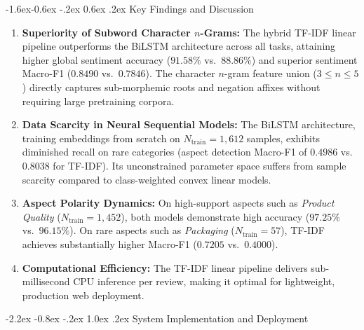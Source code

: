 \documentclass[12pt,a4paper]{article}
\makeatletter
\renewcommand{\section}{\@startsection{section}{1}{\z@}%
  {-2.2ex \@plus -0.8ex \@minus -.2ex}%
  {1.0ex \@plus.2ex}%
  {\normalfont\LARGE\bfseries}}
\renewcommand{\subsection}{\@startsection{subsection}{2}{\z@}%
  {-1.6ex\@plus -0.6ex \@minus -.2ex}%
  {0.6ex \@plus .2ex}%
  {\normalfont\Large\bfseries}}
\makeatother
\begin{document}
\subsection{Key Findings and Discussion}
\begin{enumerate}
    \item \textbf{Superiority of Subword Character $n$-Grams:} The hybrid TF-IDF linear pipeline outperforms the BiLSTM architecture across all tasks, attaining higher global sentiment accuracy ($91.58\%$ vs.\ $88.86\%$) and superior sentiment Macro-F1 ($0.8490$ vs.\ $0.7846$). The character $n$-gram feature union ($3 \le n \le 5$) directly captures sub-morphemic roots and negation affixes without requiring large pretraining corpora.
    
    \item \textbf{Data Scarcity in Neural Sequential Models:} The BiLSTM architecture, training embeddings from scratch on $N_{\mathrm{train}} = 1{,}612$ samples, exhibits diminished recall on rare categories (aspect detection Macro-F1 of $0.4986$ vs.\ $0.8038$ for TF-IDF). Its unconstrained parameter space suffers from sample scarcity compared to class-weighted convex linear models.
    
    \item \textbf{Aspect Polarity Dynamics:} On high-support aspects such as \textit{Product Quality} ($N_{\mathrm{train}} = 1{,}452$), both models demonstrate high accuracy ($97.25\%$ vs.\ $96.15\%$). On rare aspects such as \textit{Packaging} ($N_{\mathrm{train}} = 57$), TF-IDF achieves substantially higher Macro-F1 ($0.7205$ vs.\ $0.4000$).
    
    \item \textbf{Computational Efficiency:} The TF-IDF linear pipeline delivers sub-millisecond CPU inference per review, making it optimal for lightweight, production web deployment.
\end{enumerate}

\section{System Implementation and Deployment}
\label{sec:system}
\end{document}
